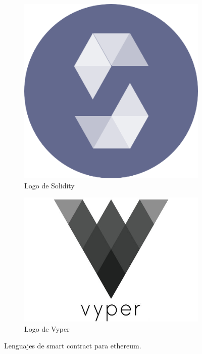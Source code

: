 \begin{figure}[hbt]
	\centering
	\begin{subfigure}[b]{0.4\linewidth}
		\centering
		\includegraphics[width=0.8\linewidth]{figs/EstadoArte/Ethereum/solidityLOGO}
		\caption{Logo de Solidity}\label{fig:solProgram}
	\end{subfigure} 
	\begin{subfigure}[b]{0.4\linewidth}
		\centering
		\includegraphics[width=0.8\linewidth]{figs/EstadoArte/Ethereum/vyperLOGO}
		\caption{Logo de Vyper}\label{fig:vyperProgram}
	\end{subfigure} 
	\caption[Lenguajes de Smart Contract]{Lenguajes de smart contract para ethereum.}
	\label{fig:programas}
\end{figure}

\clearpage

\label{sec:solidity}

